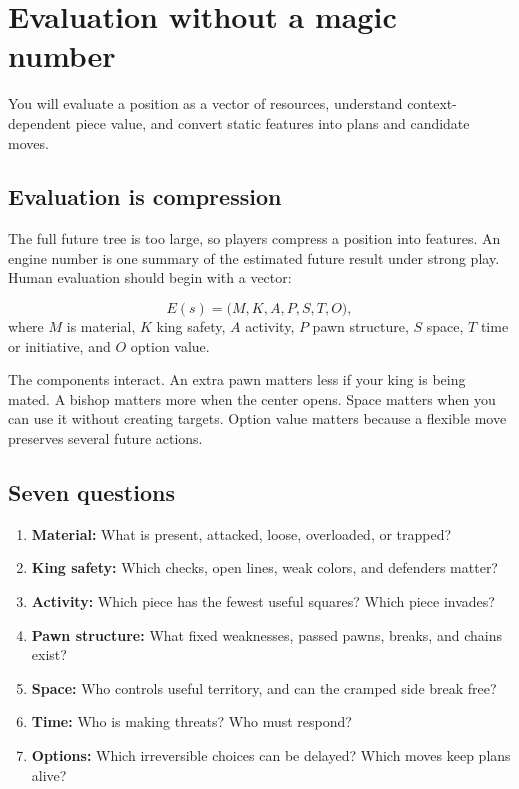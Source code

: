 \chapter{Evaluation without a magic number}
\begin{learningbox}
You will evaluate a position as a vector of resources, understand context-dependent piece value, and convert static features into plans and candidate moves.
\end{learningbox}

\section{Evaluation is compression}
The full future tree is too large, so players compress a position into features. An engine number is one summary of the estimated future result under strong play. Human evaluation should begin with a vector:

\[
E(s)=\bigl(M,K,A,P,S,T,O\bigr),
\]
where $M$ is material, $K$ king safety, $A$ activity, $P$ pawn structure, $S$ space, $T$ time or initiative, and $O$ option value.

The components interact. An extra pawn matters less if your king is being mated. A bishop matters more when the center opens. Space matters when you can use it without creating targets. Option value matters because a flexible move preserves several future actions.

\section{Seven questions}
\begin{enumerate}[label=\textbf{\arabic*.},leftmargin=2em]
\item \textbf{Material:} What is present, attacked, loose, overloaded, or trapped?
\item \textbf{King safety:} Which checks, open lines, weak colors, and defenders matter?
\item \textbf{Activity:} Which piece has the fewest useful squares? Which piece invades?
\item \textbf{Pawn structure:} What fixed weaknesses, passed pawns, breaks, and chains exist?
\item \textbf{Space:} Who controls useful territory, and can the cramped side break free?
\item \textbf{Time:} Who is making threats? Who must respond?
\item \textbf{Options:} Which irreversible choices can be delayed? Which moves keep plans alive?
\end{enumerate}

